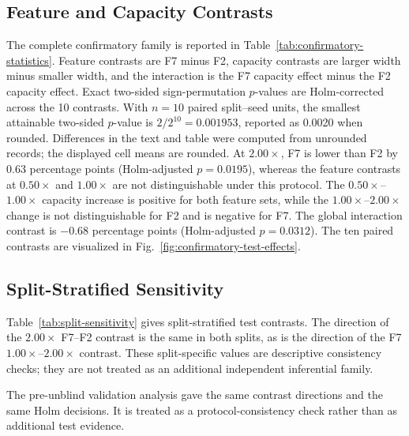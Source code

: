 \subsection{Feature and Capacity Contrasts}
The complete confirmatory family is reported in
Table~\ref{tab:confirmatory-statistics}. Feature contrasts are F7 minus F2,
capacity contrasts are larger width minus smaller width, and the interaction
is the F7 capacity effect minus the F2 capacity effect. Exact two-sided
sign-permutation $p$-values are Holm-corrected across the 10 contrasts.
With $n=10$ paired split--seed units, the smallest attainable two-sided
$p$-value is $2/2^{10}=0.001953$, reported as 0.0020 when rounded.
Differences in the text and table were computed from unrounded records; the
displayed cell means are rounded.
At $2.00\times$, F7 is lower than F2 by 0.63 percentage points
(Holm-adjusted $p=0.0195$), whereas the feature contrasts at $0.50\times$
and $1.00\times$ are not distinguishable under this protocol. The
$0.50\times$--$1.00\times$ capacity increase is positive for both feature
sets, while the $1.00\times$--$2.00\times$ change is not distinguishable for
F2 and is negative for F7. The global interaction contrast is
$-0.68$ percentage points (Holm-adjusted $p=0.0312$).
The ten paired contrasts are visualized in Fig.~\ref{fig:confirmatory-test-effects}.




\subsection{Split-Stratified Sensitivity}
Table~\ref{tab:split-sensitivity} gives split-stratified test
contrasts. The direction of the $2.00\times$ F7--F2 contrast is the same in
both splits, as is the direction of the F7 $1.00\times$--$2.00\times$
contrast. These split-specific values are descriptive consistency checks;
they are not treated as an additional independent inferential family.

The pre-unblind validation analysis gave the same contrast directions and the
same Holm decisions. It is treated as a protocol-consistency check rather than
as additional test evidence.
